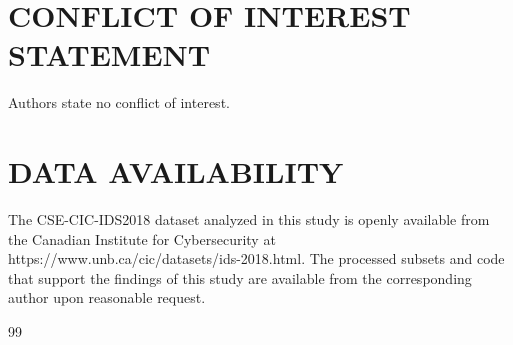 \documentclass{iaesarticle}
\begin{document}
\section*{CONFLICT OF INTEREST STATEMENT}
Authors state no conflict of interest.

\section*{DATA AVAILABILITY}
The CSE-CIC-IDS2018 dataset analyzed in this study is openly available from the Canadian Institute for Cybersecurity at https://www.unb.ca/cic/datasets/ids-2018.html. The processed subsets and code that support the findings of this study are available from the corresponding author upon reasonable request.

\begin{thebibliography}{99}
\footnotesize
\itemsep 0pt


\end{thebibliography}
\end{document}
